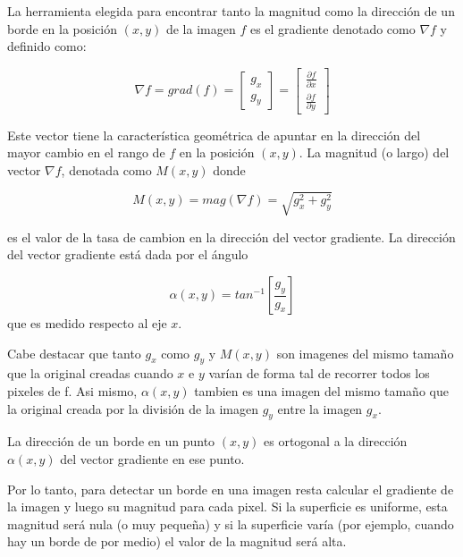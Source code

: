 La herramienta elegida para encontrar tanto la magnitud como la dirección de un borde en la posición $(x,y)$ de la imagen $f$ es el gradiente denotado como ${\nabla}f$ y definido como:

 \begin{equation}
{\nabla}f = grad(f) = \begin{bmatrix}
						{g_x} \\[0.3em]
						{g_y}
					  \end{bmatrix} = \begin{bmatrix}
										{\frac{{\partial}f}{{\partial}x}} \\[0.3em]
										{\frac{{\partial}f}{{\partial}y}}
					  				  \end{bmatrix}
 \end{equation}

Este vector tiene la característica geométrica de apuntar en la dirección del mayor cambio en el rango de $f$ en la posición $(x,y)$. La magnitud (o largo) del vector ${\nabla}f$, denotada como $M(x,y)$ donde 

\begin{equation}
M(x,y) = mag({\nabla}f) = \sqrt{g_x^2 + g_y^2}
\end{equation}

es el valor de la tasa de cambion en la dirección del vector gradiente.
La dirección del vector gradiente está dada por el ángulo 

\begin{equation}
{\alpha}(x,y) = tan^{-1}\left[\frac{g_y}{g_x}\right]
\end{equation}
que es medido respecto al eje $x$. 

Cabe destacar que tanto $g_x$ como $g_y$ y $M(x,y)$ son imagenes del mismo tamaño que la original creadas cuando $x$ e $y$ varían de forma tal de recorrer todos los pixeles de f. Asi mismo, ${\alpha}(x,y)$ tambien es una imagen del mismo tamaño que la original creada por la división de la imagen $g_y$ entre la imagen $g_x$.

La dirección de un borde en un punto $(x,y)$ es ortogonal a la dirección ${\alpha}(x,y)$ del vector gradiente en ese punto.

Por lo tanto, para detectar un borde en una imagen resta calcular el gradiente de la imagen y luego su magnitud para cada pixel. Si la superficie es uniforme, esta magnitud será nula (o muy pequeña) y si la superficie varía (por ejemplo, cuando hay un borde de por medio) el valor de la magnitud será alta.

